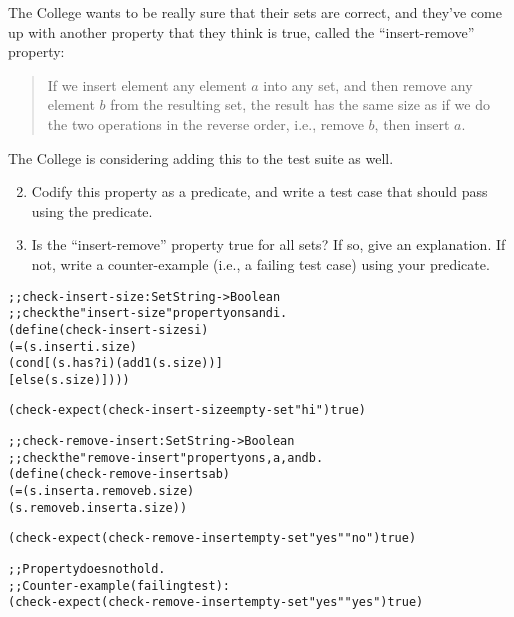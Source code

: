 \documentclass[12pt]{article}                   %
\newenvironment{solution}{\color{Red}}{}
\begin{document}
\begin{problem}
\newpage
\noindent
The College wants to be really sure that their sets are correct, and
they've come up with another property that they think is true, called
the ``insert-remove'' property:

\begin{quote}
If we insert element any element $a$ into any set, and then remove any
element $b$ from the resulting set, the result has the same size as if
we do the two operations in the reverse order, i.e., remove $b$, then
insert $a$.
\end{quote}

\noindent
The College is considering adding this to the test suite as well.

\begin{enumerate}
\setcounter{enumi}{1}

\item Codify this property as a predicate, and write a test case that
  should pass using the predicate.

\item Is the ``insert-remove'' property true for all sets?  If so,
  give an explanation.  If not, write a counter-example (i.e., a
  failing test case) using your predicate.

\end{enumerate}

\begin{solution}
\begin{alltt}
;; check-insert-size : Set String -> Boolean
;; check the "insert-size" property on s and i.
(define (check-insert-size s i)
  (= (s . insert i . size)
     (cond [(s . has? i) (add1 (s . size))]
           [else               (s . size)])))

(check-expect (check-insert-size empty-set "hi") true)

;; check-remove-insert : Set String -> Boolean
;; check the "remove-insert" property on s, a, and b.
(define (check-remove-insert s a b)
  (= (s . insert a . remove b . size)
     (s . remove b . insert a . size))

(check-expect (check-remove-insert empty-set "yes" "no") true)

;; Property does not hold.
;; Counter-example (failing test):
(check-expect (check-remove-insert empty-set "yes" "yes") true)
\end{alltt}
\end{solution}

\newpage
\ifrubric{}
\newpage
\fi
\end{problem}
\end{document}
